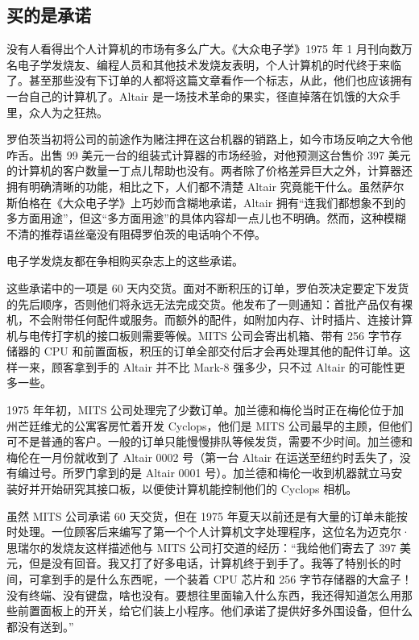 \documentclass[12pt,UTF8]{ctexbook}
\begin{document}
\subsection{买的是承诺}


没有人看得出个人计算机的市场有多么广大。《大众电子学》1975 年 1 月刊向数万名电子学发烧友、编程人员和其他技术发烧友表明，个人计算机的时代终于来临了。甚至那些没有下订单的人都将这篇文章看作一个标志，从此，他们也应该拥有一台自己的计算机了。Altair 是一场技术革命的果实，径直掉落在饥饿的大众手里，众人为之狂热。

罗伯茨当初将公司的前途作为赌注押在这台机器的销路上，如今市场反响之大令他咋舌。出售 99 美元一台的组装式计算器的市场经验，对他预测这台售价 397 美元的计算机的客户数量一丁点儿帮助也没有。两者除了价格差异巨大之外，计算器还拥有明确清晰的功能，相比之下，人们都不清楚 Altair 究竟能干什么。虽然萨尔斯伯格在《大众电子学》上巧妙而含糊地承诺，Altair 拥有“连我们都想象不到的多方面用途”，但这“多方面用途”的具体内容却一点儿也不明确。然而，这种模糊不清的推荐语丝毫没有阻碍罗伯茨的电话响个不停。

电子学发烧友都在争相购买杂志上的这些承诺。

这些承诺中的一项是 60 天内交货。面对不断积压的订单，罗伯茨决定要定下发货的先后顺序，否则他们将永远无法完成交货。他发布了一则通知：首批产品仅有裸机，不会附带任何配件或服务。而额外的配件，如附加内存、计时插片、连接计算机与电传打字机的接口板则需要等候。MITS 公司会寄出机箱、带有 256 字节存储器的 CPU 和前置面板，积压的订单全部交付后才会再处理其他的配件订单。这样一来，顾客拿到手的 Altair 并不比 Mark-8 强多少，只不过 Altair 的可能性更多一些。

1975 年年初，MITS 公司处理完了少数订单。加兰德和梅伦当时正在梅伦位于加州芒廷维尤的公寓客房忙着开发 Cyclops，他们是 MITS 公司最早的主顾，但他们可不是普通的客户。一般的订单只能慢慢排队等候发货，需要不少时间。加兰德和梅伦在一月份就收到了 Altair 0002 号（第一台 Altair 在运送至纽约时丢失了，没有编过号。所罗门拿到的是 Altair 0001 号）。加兰德和梅伦一收到机器就立马安装好并开始研究其接口板，以便使计算机能控制他们的 Cyclops 相机。

虽然 MITS 公司承诺 60 天交货，但在 1975 年夏天以前还是有大量的订单未能按时处理。一位顾客后来编写了第一个个人计算机文字处理程序，这位名为迈克尔·思瑞尔的发烧友这样描述他与 MITS 公司打交道的经历：“我给他们寄去了 397 美元，但是没有回音。我又打了好多电话，计算机终于到手了。我等了特别长的时间，可拿到手的是什么东西呢，一个装着 CPU 芯片和 256 字节存储器的大盒子！没有终端、没有键盘，啥也没有。要想往里面输入什么东西，我还得知道怎么用那些前置面板上的开关，给它们装上小程序。他们承诺了提供好多外围设备，但什么都没有送到。”
\end{document}
